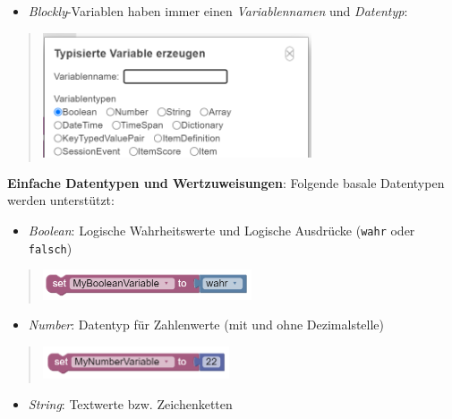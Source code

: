 \documentclass[
  letterpaper,
  DIV=11]{scrreprt}
\providecommand{\tightlist}{%
  \setlength{\itemsep}{0pt}\setlength{\parskip}{0pt}}\usepackage{longtable,booktabs,array}
\begin{document}
\begin{tcolorbox}
\begin{itemize}
\tightlist
\item
  \emph{Blockly}-Variablen haben immer einen \emph{Variablennamen} und
  \emph{Datentyp}:
\end{itemize}

\begin{quote}
\includegraphics[width=3.125in,height=\textheight]{img/screenshot-variables-palette-create-variable-02-DEU.png}
\end{quote}

\textbf{Einfache Datentypen und Wertzuweisungen}: Folgende basale
Datentypen werden unterstützt:

\begin{itemize}
\tightlist
\item
  \emph{Boolean}: Logische Wahrheitswerte und Logische Ausdrücke
  (\texttt{wahr} oder \texttt{falsch})
\end{itemize}

\begin{quote}
\includegraphics[width=2.42708in,height=\textheight]{img/screenshot-blockly-assignment-boolean-01-DEU.png}
\end{quote}

\begin{itemize}
\tightlist
\item
  \emph{Number}: Datentyp für Zahlenwerte (mit und ohne Dezimalstelle)
\end{itemize}

\begin{quote}
\includegraphics[width=2.16667in,height=\textheight]{img/screenshot-blockly-assignment-numberic-01-ENG.png}
\end{quote}

\begin{itemize}
\tightlist
\item
  \emph{String}: Textwerte bzw. Zeichenketten
\end{itemize}


\end{tcolorbox}
\end{document}

